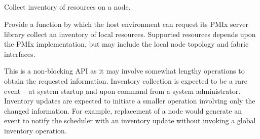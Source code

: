 \subsection{}

\summary

Collect inventory of resources on a node.

\format


\begin{arglist}
\end{arglist}

\returnsimplenb

\descr

Provide a function by which the host environment can request its \ac{PMIx} server library collect an inventory of local resources. Supported resources depends upon the \ac{PMIx} implementation, but may include the local node topology and fabric interfaces.

\advicermstart
This is a non-blocking \ac{API} as it may involve somewhat lengthy operations to obtain the requested information. Inventory collection is expected to be a rare event – at system startup and upon command from a system administrator. Inventory updates are expected to initiate a smaller operation involving only the changed information. For example, replacement of a node would generate an event to notify the scheduler with an inventory update without invoking a global inventory operation.
\advicermend

